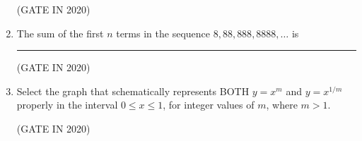 \documentclass[journal,12pt,onecolumn]{IEEEtran}
\theoremstyle{remark}
\begin{document}
\begin{enumerate}
\hfill{(GATE IN 2020)}
\begin{enumerate}
\end{enumerate}

\item The sum of the first $n$ terms in the sequence $8, 88, 888, 8888, \dots$ is \rule{2cm}{0.4pt}

\hfill{(GATE IN 2020)}
\begin{enumerate}
\end{enumerate}

\item Select the graph that schematically represents BOTH $y = x^m$ and $y = x^{1/m}$ properly in the interval $0 \leq x \leq 1$, for integer values of $m$, where $m > 1$.

\hfill{(GATE IN 2020)}

\begin{enumerate}
\end{enumerate}
\end{enumerate}
\end{document}
